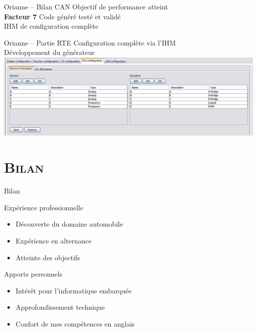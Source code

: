 \documentclass[xcolor=x11names,compress]{beamer}
\begin{document}
\begin{frame}{Orianne -- Bilan CAN}
  \centering
  Objectif de performance atteint\\
  \vfill
  {\large {\bf Facteur 7}}
  \vfill
  Code généré testé et validé\\
  IHM de configuration complète
\end{frame}

\begin{frame}{Orianne -- Partie RTE}
  \centering
  \vfill
  Configuration complète via l'IHM\\
  Développement du générateur
  \vfill
  \includegraphics[scale=0.3]{images/rte_conf}
\end{frame}

\section{\scshape Bilan}
\begin{frame}{Bilan}
  \vfill
  \begin{exampleblock}{Expérience professionnelle}{}
  \begin{itemize}
	\item Découverte du domaine automobile
	\item Expérience en alternance
	\item Atteinte des objectifs
  \end{itemize}
  \end{exampleblock}
  \vfill
  \begin{exampleblock}{Apports personnels}{}
  \begin{itemize}
	\item Intérêt pour l'informatique embarquée
	\item Approfondissement technique
	\item Confort de mes compétences en anglais
  \end{itemize}
  \end{exampleblock}
  \vfill
\end{frame}
\end{document}
